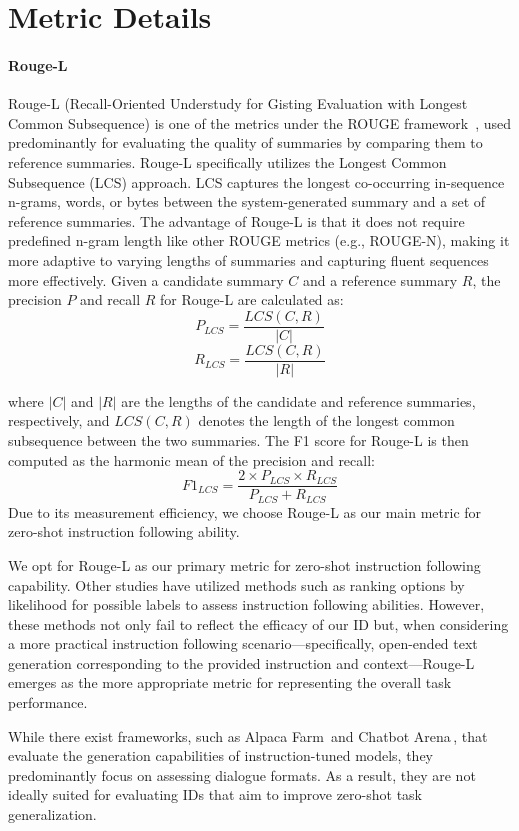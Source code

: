 \section{Metric Details}
\label{metric_details}
\paragraph{Rouge-L} 
Rouge-L (Recall-Oriented Understudy for Gisting Evaluation with Longest Common Subsequence) is one of the metrics under the ROUGE framework \,\citep{rouge}, used predominantly for evaluating the quality of summaries by comparing them to reference summaries. Rouge-L specifically utilizes the Longest Common Subsequence (LCS) approach. LCS captures the longest co-occurring in-sequence n-grams, words, or bytes between the system-generated summary and a set of reference summaries. The advantage of Rouge-L is that it does not require predefined n-gram length like other ROUGE metrics (e.g., ROUGE-N), making it more adaptive to varying lengths of summaries and capturing fluent sequences more effectively. Given a candidate summary \( C \) and a reference summary \( R \), the precision \( P \) and recall \( R \) for Rouge-L are calculated as:
\[ P_{LCS} = \frac{LCS(C, R)}{|C|} \]
\[ R_{LCS} = \frac{LCS(C, R)}{|R|} \]

\noindent where \( |C| \) and \( |R| \) are the lengths of the candidate and reference summaries, respectively, and \( LCS(C, R) \) denotes the length of the longest common subsequence between the two summaries. The F1 score for Rouge-L is then computed as the harmonic mean of the precision and recall:
\[ F1_{LCS} = \frac{2 \times P_{LCS} \times R_{LCS}}{P_{LCS} + R_{LCS}} \]
Due to its measurement efficiency, we choose Rouge-L as our main metric for zero-shot instruction following ability. 


We opt for Rouge-L as our primary metric for zero-shot instruction following capability. Other studies \citep{mmlu,flip} have utilized methods such as ranking options by likelihood for possible labels to assess instruction following abilities. However, these methods not only fail to reflect the efficacy of our ID but, when considering a more practical instruction following scenario—specifically, open-ended text generation corresponding to the provided instruction and context—Rouge-L emerges as the more appropriate metric for representing the overall task performance.

While there exist frameworks, such as Alpaca Farm\,\citep{alpacafarm} and Chatbot Arena\,\citep{chatbot-arena}, that evaluate the generation capabilities of instruction-tuned models, they predominantly focus on assessing dialogue formats. As a result, they are not ideally suited for evaluating IDs that aim to improve zero-shot task generalization.
